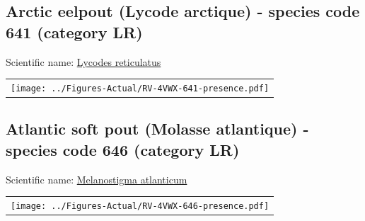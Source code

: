 \documentclass[12pt]{article}\usepackage[]{graphicx}\usepackage[]{color}
\begin{document}
\setcounter{figure}{0}

\hypertarget{sec:641}{%
\subsection{Arctic eelpout (Lycode arctique) - species code 641 (category LR)}\label{sec:641}}

  


Scientific name: \href{http://www.marinespecies.org/aphia.php?p=taxdetails\&id=127112}{Lycodes reticulatus} \newline
\begin{minipage}{1.0\textwidth}
 \begin{tabular}{c}
\texttt{[image: ../Figures-Actual/RV-4VWX-641-presence.pdf]} \\ 
\end{tabular} 
\end{minipage}
\clearpage

\renewcommand\thefigure{\thesubsection\Alph{figure}}

\setcounter{figure}{0}

\hypertarget{sec:646}{%
\subsection{Atlantic soft pout (Molasse atlantique) - species code 646 (category LR)}\label{sec:646}}

  


Scientific name: \href{http://www.marinespecies.org/aphia.php?p=taxdetails\&id=127120}{Melanostigma atlanticum} \newline
\begin{minipage}{1.0\textwidth}
 \begin{tabular}{c}
\texttt{[image: ../Figures-Actual/RV-4VWX-646-presence.pdf]} \\ 
\end{tabular} 
\end{minipage}
\clearpage

\renewcommand\thefigure{\thesubsection\Alph{figure}}
\end{document}

